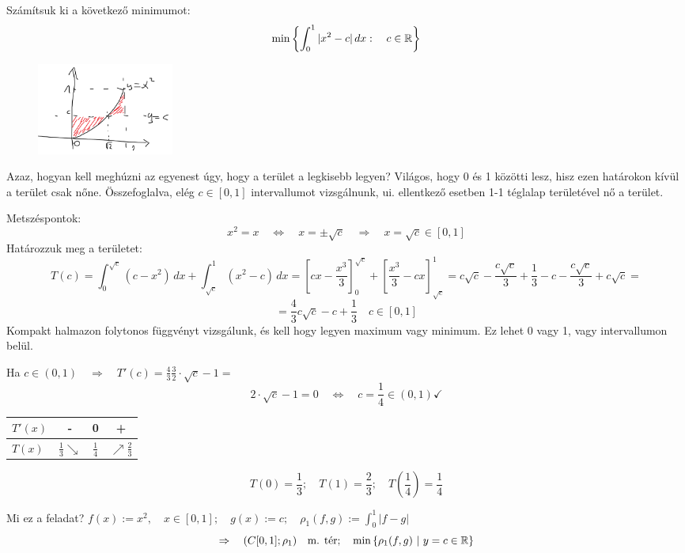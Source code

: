 \documentclass[a4paper,11.5pt]{article}
\begin{document}
	\begin{example}
		Számítsuk ki a következő minimumot:
		\[ \min\left\{\int _0^1|x^2-c|\,dx:\quad c\in\mathbb{R} \right\} \]
		\begin{figure}[H]
			\centering
			\includegraphics[height=3cm]{kepek/10.png}
			\caption{}
		\end{figure}
		
		Azaz, hogyan kell meghúzni az egyenest úgy, hogy a terület a legkisebb legyen? Világos, hogy 0 és 1 közötti lesz, hisz ezen határokon kívül a terület csak nőne. Összefoglalva, elég $c\in[0,1]$ intervallumot vizsgálnunk, ui. ellentkező esetben 1-1 téglalap területével nő a terület.
		
		Metszéspontok:
		\[ x^2=x\quad \Leftrightarrow\quad x=\pm\sqrt{c}\quad \Rightarrow\quad x=\sqrt{c}\in[0,1] \]
		Határozzuk meg a területet:
		\[ T(c)=\int_0^{\sqrt{c}}(c-x^2)\,dx+\int_{\sqrt{c}}^{1}(x^2-c)\,dx=\left[cx-\frac{x^3}{3}\right]_0^{\sqrt{c}}+\left[\frac{x^3}{3}-cx\right]^1_{\sqrt{c}}=c\sqrt{c}-\frac{c\sqrt{c}}{3}+\frac{1}{3}-c-\frac{c\sqrt{c}}{3}+c\sqrt{c}=\]
		\[=\frac{4}{3}c\sqrt{c}-c+\frac{1}{3}\quad c\in[0,1] \]
		Kompakt halmazon folytonos függvényt vizsgálunk, és kell hogy legyen maximum vagy minimum. Ez lehet 0 vagy 1, vagy intervallumon belül.
		
		Ha $c\in(0,1)\quad \Rightarrow\quad T'(c)=\frac{4}{3}\frac{3}{2}\cdot\sqrt{c}-1=$
		\[ 2\cdot\sqrt{c}-1=0\quad \Leftrightarrow\quad c=\frac{1}{4}\in(0,1)\checkmark \]
		\begin{center}		
			\begin{tabular}{l|c|c|c}
				$T'(x)$&-&0&+\\
				\hline
				$T(x)$&$\frac{1}{3}\searrow$&$\frac{1}{4}$&$\nearrow\frac{2}{3}$
			\end{tabular}
		\end{center}
		\[ T(0)=\frac{1}{3};\quad T(1)=\frac{2}{3};\quad T(\frac{1}{4})=\frac{1}{4} \]
	\end{example}
	\begin{note}
		Mi ez a feladat? $f(x):=x^2, \quad x\in[0,1];\quad g(x):=c;\quad \rho_1(f,g):=\int_0^1|f-g|$
		\[ \Rightarrow\quad (C[0,1];\rho_1) \quad \text{m. tér};\quad \min\left\{\rho_1(f,g)\ | \ y=c\in\R\right\} \]
	\end{note}
\end{document}

